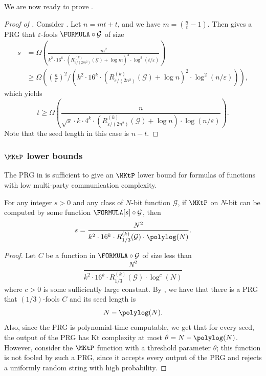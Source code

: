 	We are now ready to prove .
	
	\begin{proof}[Proof of ]
		Consider . Let $n=mt+t$, and we have $m=\left(\frac{n}{t}-1\right)$. Then 
		 gives a PRG that $\varepsilon$-fools $\FORMULA\circ\mathcal{G}$ of size
		\begin{align*}
			s &= \Omega\left( \frac{m^2}{k^2\cdot16^{k}\cdot\left(R^{(k)}_{\varepsilon/(2m^2)}(\mathcal{G})+\log m\right)^2\cdot\log^2(t/\varepsilon)}\right)\\
			&\geq \Omega\left(\left(\frac{n}{t}\right)^2/\left(k^2\cdot16^{k}\cdot\left(R^{(k)}_{\varepsilon/(2n^2)}(\mathcal{G})+\log n\right)^2\cdot\log^2(n/\varepsilon)\right)\right),
		\end{align*}
		which yields
		\[
			t\geq \Omega\left(\frac{n}{\sqrt{s}\cdot k\cdot4^{k}\cdot\left(R^{(k)}_{\varepsilon/(2n^2)}(\mathcal{G})+\log n\right)\cdot\log(n/\varepsilon)}\right).
		\]
		Note that the seed length in this case is $n-t$.
	\end{proof}

	\subsubsection{\texorpdfstring{$\MKtP$}{MKtP} lower bounds}
	
	The PRG in  is sufficient to give an $\MKtP$ lower bound for formulas of functions with low multi-party communication complexity.
	
	\begin{theorem}\label{thm:prg-mktp}
	    For any integer $s>0$ and any class of $N$-bit function $\mathcal{G}$, if $\MKtP$ on $N$-bit can be computed by some function $\FORMULA[s]\circ \mathcal{G}$, then
	    \[
            s= \frac{N^2}{k^2\cdot16^{k}\cdot R^{(k)}_{1/3}(\mathcal{G})\cdot \polylog(N)}.
	    \]
	\end{theorem}
	
	\begin{proof}
    	Let $C$ be a function in $\FORMULA\circ\mathcal{G}$ of size less than
    	\[
    	    \frac{N^2}{k^2\cdot16^{k}\cdot R^{(k)}_{1/3}(\mathcal{G})\cdot\log^c(N)}
    	\]
    	where $c>0$ is some sufficiently large constant. By , we have that there is a PRG that $(1/3)$-fools $C$ and its seed length is
    	\[
             N-\polylog(N).
    	\]
    	Also, since the PRG is polynomial-time computable, we get that for every seed, the output of the PRG has $\mathrm{Kt}$ complexity at most $\theta=N-\polylog(N)$. However, consider the $\MKtP$ function with a threshold parameter $\theta$; this function is not fooled by such a PRG, since it accepts every output of the PRG and rejects a uniformly random string with high probability. 
    \end{proof}
    
